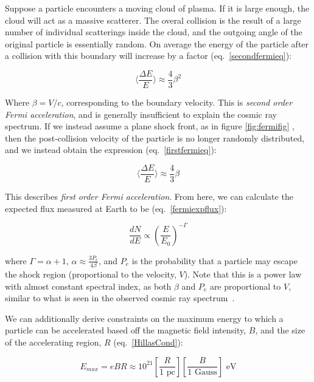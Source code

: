 Suppose a particle encounters a moving cloud of plasma. If it is large enough, the cloud will act as a massive scatterer. The overal collision is the result of a large number of individual scatterings inside the cloud, and the outgoing angle of the original particle is essentially random. On average the energy of the particle after a collision with this boundary will increase by a factor (eq.~\ref{secondfermieq}):

\begin{equation}
    \langle\frac{\Delta E}{E}\rangle \approx \frac{4}{3}\beta^2
\label{secondfermieq}
\end{equation}

Where $\beta=V/c$, corresponding to the boundary velocity. This is \textit{second order Fermi acceleration}, and is generally insufficient to explain the cosmic ray spectrum. If we instead assume a plane shock front, as in figure \ref{fig:fermifig} , then the post-collision velocity of the particle is no longer randomly distributed, and we instead obtain the expression (eq.~\ref{firstfermieq}):

\begin{equation}
    \langle\frac{\Delta E}{E}\rangle \approx \frac{4}{3}\beta
\label{firstfermieq}
\end{equation}

This describes \textit{first order Fermi acceleration}. From here, we can calculate the expected flux measured at Earth to be (eq.~\ref{fermiexpflux}):

\begin{equation}
    \frac{dN}{dE} \propto (\frac{E}{E_0})^{-\Gamma}
\label{fermiexpflux}
\end{equation}

where $\Gamma=\alpha+1$, $\alpha\approx \frac{3P_e}{4 \beta}$, and $P_e$ is the probability that a particle may escape the shock region (proportional to the velocity, $V$). Note that this is a power law with almost constant spectral index, as both $\beta$ and $P_e$ are proportional to $V$, similar to what is seen in the observed cosmic ray spectrum~\cite{pimenta_partphys}. 

We can additionally derive constraints on the maximum energy to which a particle can be accelerated based off the magnetic field intensity, $B$, and the size of the accelerating region, $R$ (eq.~\ref{HillasCond}):

\begin{equation}
    E_{max} = eBR \approx 10^{21} [\frac{R}{\textrm{1 pc}}][\frac{B}{\textrm{1 Gauss}}] \textrm{ eV}
\label{HillasCond}
\end{equation}

